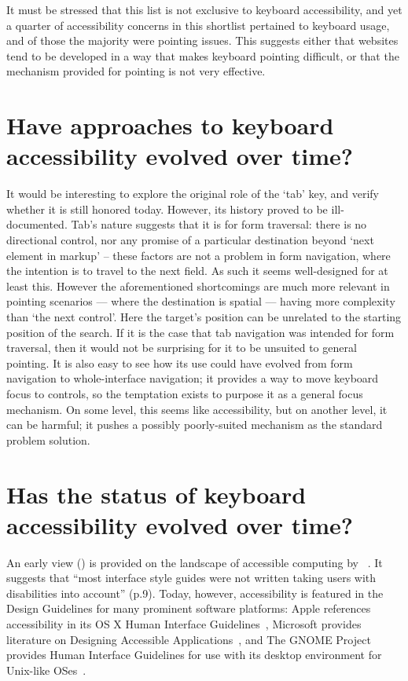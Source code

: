 \documentclass[11pt,openright,a4paper]{report}
\begin{document}
It must be stressed that this list is not exclusive to keyboard accessibility, and yet a quarter of accessibility concerns in this shortlist pertained to keyboard usage, and of those the majority were pointing issues. This suggests either that websites tend to be developed in a way that makes keyboard pointing difficult, or that the mechanism provided for pointing is not very effective.
\section{Have approaches to keyboard accessibility evolved over time?}
It would be interesting to explore the original role of the `tab' key, and verify whether it is still honored today. However, its history proved to be ill-documented. Tab's nature suggests that it is for form traversal: there is no directional control, nor any promise of a particular destination beyond `next element in markup' -- these factors are not a problem in form navigation, where the intention is to travel to the next field. As such it seems well-designed for at least this. However the aforementioned shortcomings are much more relevant in pointing scenarios --- where the destination is spatial --- having more complexity than `the next control'. Here the target's position can be unrelated to the starting position of the search.
If it is the case that tab navigation was intended for form traversal, then it would not be surprising for it to be unsuited to general pointing. It is also easy to see how its use could have evolved from form navigation to whole-interface navigation; it provides a way to move keyboard focus to controls, so the temptation exists to purpose it as a general focus mechanism. On some level, this seems like accessibility, but on another level, it can be harmful; it pushes a possibly poorly-suited mechanism as the standard problem solution.
\section{Has the status of keyboard accessibility evolved over time?}
\label{a11yevolution}
An early view (\citeyear{bergman1995towards}) is provided on the landscape of accessible computing by \citeauthor{bergman1995towards}~\cite{bergman1995towards}. It suggests that ``most interface style guides were not written taking users with disabilities into account'' (p.9). Today, however, accessibility is featured in the Design Guidelines for many prominent software platforms: Apple references accessibility in its OS X Human Interface Guidelines~\cite{applehig}, Microsoft provides literature on Designing Accessible Applications~\cite{microsofthig}, and The GNOME Project provides Human Interface Guidelines for use with its desktop environment for Unix-like OSes~\cite{gnomehig}.
\end{document}
